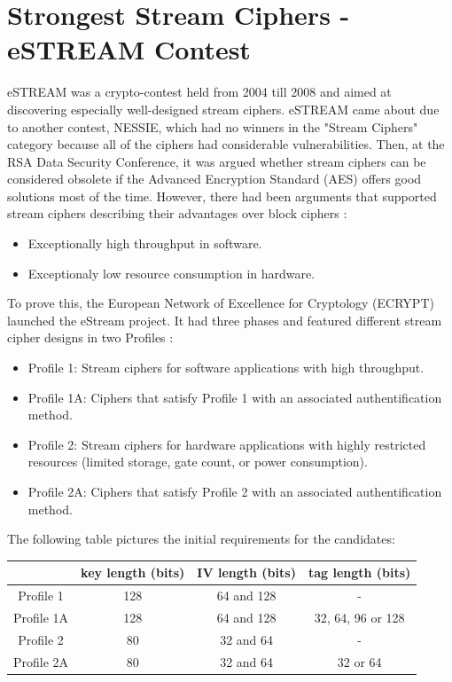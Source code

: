 
	\section{Strongest Stream Ciphers - eSTREAM Contest}
	
	eSTREAM was a crypto-contest held from 2004 till 2008 and aimed at discovering especially well-designed stream ciphers. eSTREAM came about due to another contest, NESSIE, which had no winners in the "Stream Ciphers" category because all of the ciphers had considerable vulnerabilities. Then, at the RSA Data Security Conference, it was argued whether stream ciphers can be considered obsolete if the Advanced Encryption Standard (AES) offers good solutions most of the time. However, there had been arguments that supported stream ciphers describing their advantages over block ciphers \cite{robshaw2008estream}:
	\begin{itemize}
		\setlength\itemsep{0.1em}
		\item Exceptionally high throughput in software.
		\item Exceptionaly low resource consumption in hardware.
	\end{itemize}
	To prove this, the European Network of Excellence for Cryptology (ECRYPT) launched the eStream project. It had three phases and featured different stream cipher designs in two Profiles \cite{robshaw2008estream}:
	\begin{itemize}
		\item[] Profile 1: Stream ciphers for software applications with high throughput.
		\item[] Profile 1A: Ciphers that satisfy Profile 1 with an associated authentification method.
		\item[] Profile 2: Stream ciphers for hardware applications with highly restricted resources (limited storage, gate count, or power consumption).
		\item[] Profile 2A: Ciphers that satisfy Profile 2 with an associated authentification method.
	\end{itemize}
	
	The following table pictures the initial requirements for the candidates:
	\begin{table}[h!]
		\centering
		\begin{tabular}{| c c c c|} 
			\hline
			& key length (bits) & IV length (bits) & tag length (bits) \\ [0.5ex] 
			\hline
			Profile 1 & 128 & 64 and 128 & - \\ 
			Profile 1A & 128 & 64 and 128 & 32, 64, 96 or 128 \\
			Profile 2 & 80 & 32 and 64 & - \\
			Profile 2A & 80 & 32 and 64 & 32 or 64 \\[1ex] 
			\hline
		\end{tabular}
		\label{table:Initial requirements for the candidates}
	\end{table}
	
